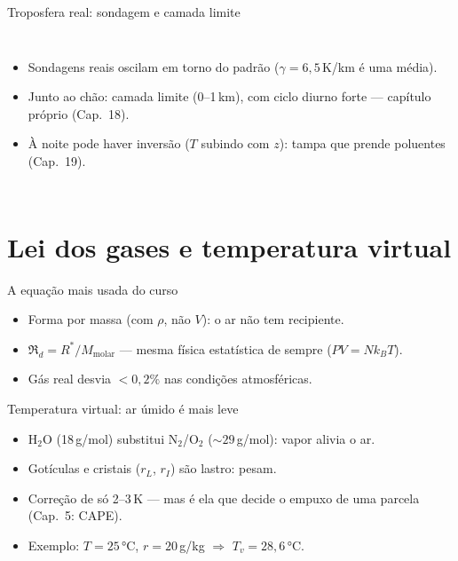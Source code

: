 \documentclass[aspectratio=169,11pt]{beamer}
\begin{document}
\begin{frame}{Troposfera real: sondagem e camada limite}
  \begin{columns}
    \begin{itemize}
      \item Sondagens reais oscilam em torno do padrão
            ($\gamma = 6{,}5$\,K/km é uma média).
      \item Junto ao chão: \alert{camada limite} (0--1\,km), com ciclo
            diurno forte — capítulo próprio (Cap.~18).
      \item À noite pode haver \alert{inversão} ($T$ subindo com $z$):
            tampa que prende poluentes (Cap.~19).
    \end{itemize}
  \end{columns}
\end{frame}

\section{Lei dos gases e temperatura virtual}

\begin{frame}{A equação mais usada do curso}
  \vspace{0.5em}
  \begin{itemize}
    \item Forma por massa (com $\rho$, não $V$): o ar não tem recipiente.
    \item $\Re_d = R^*/M_{\text{molar}}$ — mesma física estatística de
          sempre ($PV = Nk_BT$).
    \item Gás real desvia $<0{,}2\%$ nas condições atmosféricas.
  \end{itemize}
\end{frame}

\begin{frame}{Temperatura virtual: ar úmido é mais leve}
  \vspace{0.5em}
  \begin{itemize}
    \item H$_2$O (18\,g/mol) substitui N$_2$/O$_2$ ($\sim29$\,g/mol):
          vapor \alert{alivia} o ar.
    \item Gotículas e cristais ($r_L$, $r_I$) são lastro: \alert{pesam}.
    \item Correção de só 2--3\,K — mas é ela que decide o empuxo de uma
          parcela (Cap.~5: CAPE).
    \item Exemplo: $T=25\,°$C, $r=20$\,g/kg $\Rightarrow$
          $T_v = 28{,}6\,°$C.
  \end{itemize}
\end{frame}
\end{document}
